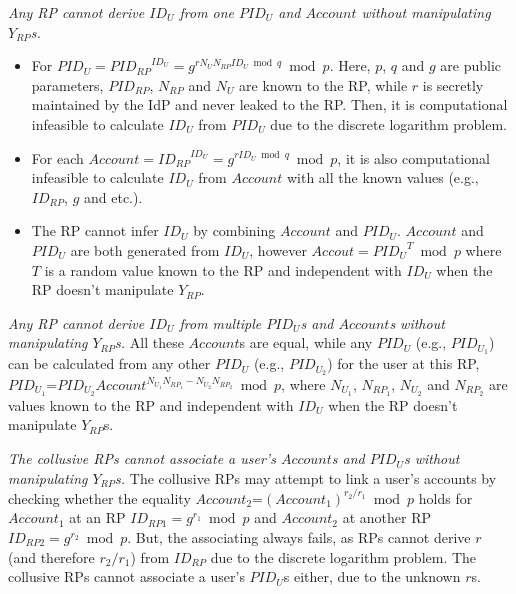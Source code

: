%
%
\emph{Any RP cannot derive $ID_U$ from one $PID_U$ and $Account$ without manipulating $Y_{RP}$s.}
\begin{itemize}
  \item For $PID_U = {PID_{RP}}^{ID_U} = g^{rN_UN_{RP}ID_U \bmod q} \bmod p$.
      Here, $p$, $q$ and $g$ are public parameters,
        $PID_{RP}$, $N_{RP}$ and $N_U$ are known to the RP, while $r$ is secretly maintained by the IdP and never leaked to the RP.
      Then, it is computational infeasible to calculate $ID_U$ from $PID_U$
           due to the discrete logarithm problem.

  \item For each $Account = {ID_{RP}}^{ID_U}  = g^{rID_U \bmod q} \bmod p$,
    it is also computational infeasible to calculate $ID_U$ from $Account$ with all the known values (e.g., $ID_{RP}$, $g$ and etc.).

  \item The RP cannot infer $ID_U$ by combining $Account$ and $PID_U$.
        $Account$ and $PID_U$ are both generated from $ID_U$, however $Accout={PID_U}^T \bmod p$
          where $T$ is a random value known to the RP and independent with $ID_U$
           when the  RP doesn't manipulate $Y_{RP}$.
\end{itemize}

\emph{Any RP cannot derive $ID_U$ from multiple $PID_U$s and $Account$s without manipulating $Y_{RP}$s.}
      All these $Account$s are equal,
      while any $PID_{U}$ (e.g., $PID_{U_1}$) can be calculated from any other $PID_{U}$ (e.g., $PID_{U_2}$) for the user at this RP,
      $PID_{U_1}$=$PID_{U_2}Account^{N_{U_1}N_{RP_1}-N_{U_2}N_{RP_2}} \bmod p$, where $N_{U_1}$, $N_{RP_1}$, $N_{U_2}$ and $N_{RP_2}$ are values known to the RP and independent with $ID_U$ when the RP doesn't manipulate $Y_{RP}$s.

\emph{The collusive RPs cannot associate a user's $Account$s and $PID_U$s without manipulating $Y_{RP}$s.}
     The collusive RPs may attempt to link a user's accounts
       by checking whether the equality $Account_2$=$(Account_1)^{r_2/r_1} \bmod p$ holds for $Account_1$ at an RP $ID_{RP1} = g^{r_1} \bmod p$ and $Account_2$ at another RP $ID_{RP2} = g^{r_2} \bmod p$.
     But, the associating always fails, as RPs cannot derive $r$ (and therefore ${r_2/r_1}$) from $ID_{RP}$ due to the discrete logarithm problem.
     The collusive RPs cannot associate a user's  $PID_U$s either, due to the unknown $r$s.


